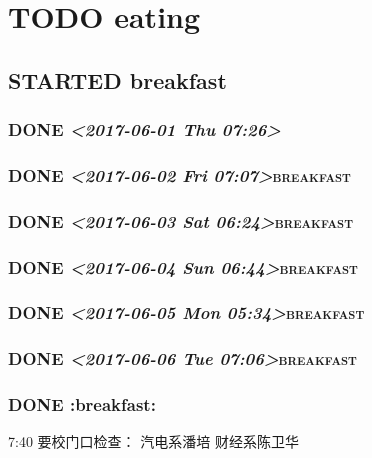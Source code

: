 \documentclass[cyan]{elegantnote}
\author{mac}
\date{\today}
\title{}
\begin{document}
\tableofcontents

\chapter{{\bfseries\sffamily TODO} eating}
\label{sec:org540f854}
\section{{\bfseries\sffamily STARTED} breakfast}
\label{sec:org3e4c569}
\subsection{{\bfseries\sffamily DONE} \textit{<2017-06-01 Thu 07:26>}}
\label{sec:orga41525a}

\subsection{{\bfseries\sffamily DONE} \textit{<2017-06-02 Fri 07:07>}\hfill{}\textsc{breakfast}}
\label{sec:org0e41bf6}

\subsection{{\bfseries\sffamily DONE} \textit{<2017-06-03 Sat 06:24>}\hfill{}\textsc{breakfast}}
\label{sec:org677f2eb}

\subsection{{\bfseries\sffamily DONE} \textit{<2017-06-04 Sun 06:44>}\hfill{}\textsc{breakfast}}
\label{sec:orga7789d9}

\subsection{{\bfseries\sffamily DONE} \textit{<2017-06-05 Mon 05:34>}\hfill{}\textsc{breakfast}}
\label{sec:org04b4fd0}

\subsection{{\bfseries\sffamily DONE} \textit{<2017-06-06 Tue 07:06>}\hfill{}\textsc{breakfast}}
\label{sec:org06a8ed9}

\subsection{{\bfseries\sffamily DONE} :breakfast:}
\label{sec:org4376705}
7:40 要校门口检查：
汽电系潘培
财经系陈卫华
\end{document}
